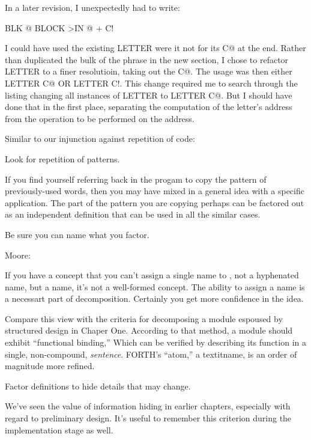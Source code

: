 In a later revision, I unexpectedly had to write:

\begin{Code}
BLK @ BLOCK  >IN @ +  C!
\end{Code}
I could have used the existing LETTER were it not for its C@ at the end. Rather than duplicated the bulk of the phrase in the new section, I chose to refactor LETTER to a finer resolutioin, taking out the C@. The usage was then either LETTER C@ OR LETTER C!. This change required me to search through the listing changing all instances of LETTER to LETTER C@. But I should have done that in the first place, separating the computation of the letter's address from the operation to be performed on the address.

Similar to our injunction against repetition of code:

\begin{tip}
Look for repetition of patterns.
\end{tip}
If you find yourself referring back in the progam to copy the pattern of previously-used words, then you may have mixed in a general idea with a specific application. The part of the pattern you are copying perhaps can be factored out as an independent definition that can be used in all the similar cases.

\begin{tip}
Be sure you can name what you factor.
\end{tip}

\begin{interview}
Moore:

\begin{tfquot}
If you have a concept that you can't assign a single name to , not a hyphenated name, but a name, it's not a well-formed concept. The ability to assign a name is a necessart part of decomposition. Certainly you get more confidence in the idea.
\end{tfquot}
\end{interview}
Compare this view with the criteria for decomposing a module espoused by structured design in Chaper One. According to that method, a module should exhibit ``functional binding,'' Which can be verified by describing its function in a single, non-compound, \emph{sentence}. FORTH's ``atom,'' a textit{name}, is an order of magnitude more refined.

\begin{tip}
Factor definitions to hide details that may change.
\end{tip}
We've seen the value of information hiding in earlier chapters, especially with regard to preliminary design. It's useful to remember this criterion during the implementation stage as well.

